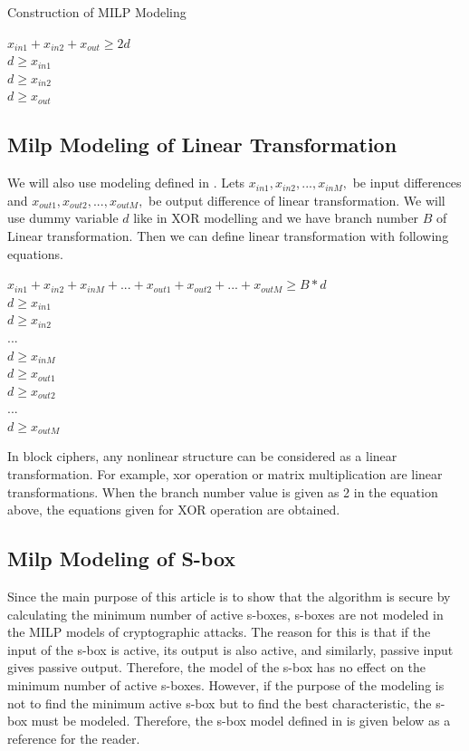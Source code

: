 \begin{section}{Construction of MILP Modeling}
\begin{center}
    $x_{in1} + x_{in2} + x_{out} \geq 2d $ \\
    $d \geq x_{in1} $ \\
    $d \geq x_{in2} $ \\
    $d \geq x_{out} $ 
\end{center}

\subsection{Milp Modeling of Linear Transformation }
We will also use modeling defined in \cite{mouha2012differential}. Lets $x_{in1}, x_{in2}, ... ,x_{inM}, $ be input differences and $x_{out1}, x_{out2}, ... ,x_{outM}, $ be output difference of linear transformation. We will use dummy variable $d$ like in XOR modelling and we have branch number $B$ of Linear transformation. Then we can define linear transformation with following equations. 

\begin{center}
    $x_{in1} + x_{in2} + x_{inM} + ... + x_{out1} + x_{out2} + ... + x_{outM}  \geq B*d $ \\
    $d \geq x_{in1} $ \\
    $d \geq x_{in2} $ \\
    $...$\\
    $d \geq x_{inM} $ \\
    $d \geq x_{out1} $\\
    $d \geq x_{out2} $ \\
    $...$\\
    $d \geq x_{outM} $
\end{center}

In block ciphers, any nonlinear structure can be considered as a linear transformation. For example, xor operation or matrix multiplication are linear transformations. When the branch number value is given as 2 in the equation above, the equations given for XOR operation are obtained.

\subsection{Milp Modeling of S-box}

Since the main purpose of this article is to show that the algorithm is secure by calculating the minimum number of active s-boxes, s-boxes are not modeled in the MILP models of cryptographic attacks. The reason for this is that if the input of the s-box is active, its output is also active, and similarly, passive input gives passive output. Therefore, the model of the s-box has no effect on the minimum number of active s-boxes. However, if the purpose of the modeling is not to find the minimum active s-box but to find the best characteristic, the s-box must be modeled. Therefore, the s-box model defined in \cite{sun2014automatic} is given below as a reference for the reader.


\end{section}
